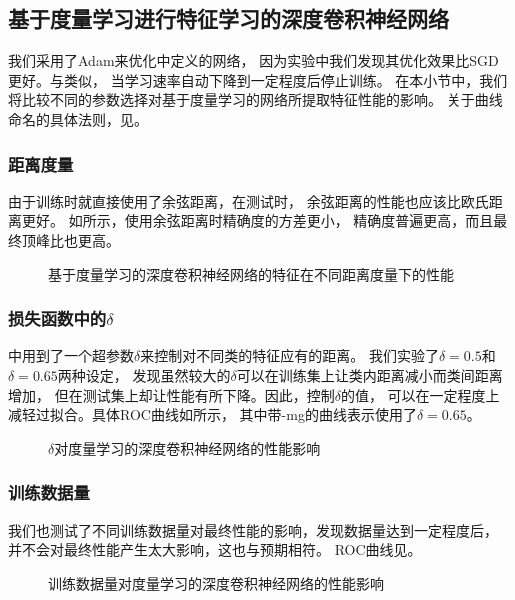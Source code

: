 \subsection{基于度量学习进行特征学习的深度卷积神经网络}
我们采用了Adam\cite{kingma2014adam}来优化中定义的网络，
因为实验中我们发现其优化效果比SGD更好。与类似，
当学习速率自动下降到一定程度后停止训练。
在本小节中，我们将比较不同的参数选择对基于度量学习的网络所提取特征性能的影响。
关于曲线命名的具体法则，见。

\subsubsection{距离度量}
由于训练时就直接使用了余弦距离，在测试时，
余弦距离的性能也应该比欧氏距离更好。
如所示，使用余弦距离时精确度的方差更小，
精确度普遍更高，而且最终顶峰比也更高。

\begin{figure}[h!]
    \caption{基于度量学习的深度卷积神经网络的特征在不同距离度量下的性能}
    \label{fig:expr:curve:mtrc:measure}
\end{figure}

\subsubsection{损失函数中的$\delta$}
中用到了一个超参数$\delta$来控制对不同类的特征应有的距离。
我们实验了$\delta=0.5$和$\delta=0.65$两种设定，
发现虽然较大的$\delta$可以在训练集上让类内距离减小而类间距离增加，
但在测试集上却让性能有所下降。因此，控制$\delta$的值，
可以在一定程度上减轻过拟合。具体ROC曲线如所示，
其中带-mg的曲线表示使用了$\delta=0.65$。

\begin{figure}[h!]
    \caption{$\delta$对度量学习的深度卷积神经网络的性能影响}
    \label{fig:expr:curve:mtrc:delta}
\end{figure}

\subsubsection{训练数据量}
我们也测试了不同训练数据量对最终性能的影响，发现数据量达到一定程度后，
并不会对最终性能产生太大影响，这也与预期相符。
ROC曲线见。
\begin{figure}[h!]
    \caption{训练数据量对度量学习的深度卷积神经网络的性能影响}
    \label{fig:expr:curve:mtrc:datasize}
\end{figure}

